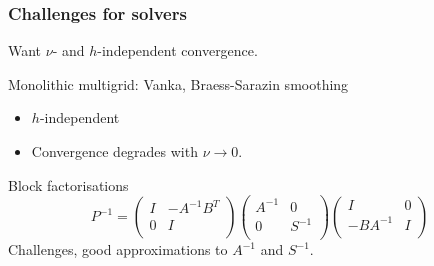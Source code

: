 \documentclass[presentation]{beamer}
\newcommand{\cmark}{\ding{51}}
\newcommand{\xmark}{\ding{55}}
\begin{document}
\begin{frame}
  \frametitle{Challenges for solvers}
  Want $\nu$- and $h$-independent convergence.
  \begin{block}{Monolithic multigrid: Vanka, Braess-Sarazin smoothing}
    \begin{itemize}
    \item[\cmark] $h$-independent
    \item[\xmark] Convergence degrades with $\nu \to 0$.
    \end{itemize}
  \end{block}
  \begin{block}{Block factorisations}
    \begin{equation*}
      P^{-1} =
      \begin{pmatrix}
        I   & -A^{-1} B^T \\
        0 & I \\
      \end{pmatrix}
      \begin{pmatrix}
        A^{-1}  & 0 \\
        0 & S^{-1} \\
      \end{pmatrix}
      \begin{pmatrix}
        I   & 0 \\
        -BA^{-1} & I \\
      \end{pmatrix}
    \end{equation*}
    Challenges, good approximations to $A^{-1}$ and $S^{-1}$.
  \end{block}
\end{frame}
\end{document}
